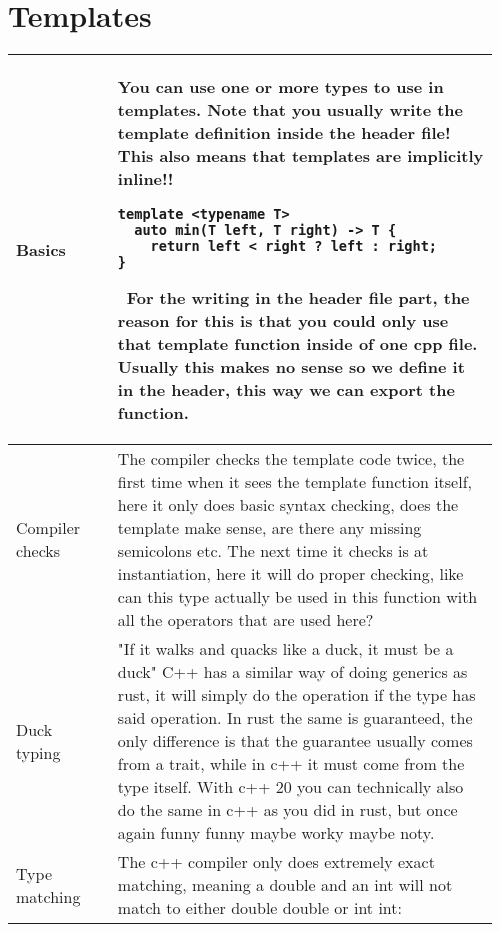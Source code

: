 \documentclass[main.tex,fontsize=8pt,paper=a4,paper=portrait,DIV=calc,]{scrartcl}
\begin{document}
\begin{table}[ht!]
\section{Templates}
\begin{tabular}{|m{0.2\linewidth}|m{0.755\linewidth}|}
\hline
Basics & 
You can use one or more types to use in templates.\newline
\textcolor{OliveGreen}{Note that you usually write the template definition inside the header file!\newline
\textbf{This also means that templates are implicitly inline!!}}\newline
\begin{lstlisting}
template <typename T>
  auto min(T left, T right) -> T {
    return left < right ? left : right;
}
\end{lstlisting}
\, \newline
For the writing in the header file part, the reason for this is that you could only use that template function inside of one cpp file. Usually this makes no sense so we define it in the header, this way we can export the function.\\
\hline
Compiler checks & 
The compiler checks the template code twice, the first time when it sees the template function itself, here it only does basic syntax checking, does the template make sense, are there any missing semicolons etc.\newline
The next time it checks is at instantiation, here it will do proper checking, like can this type actually be used in this function with all the operators that are used here?\\
\hline
Duck typing & 
"If it walks and quacks like a duck, it must be a duck"\newline
C++ has a similar way of doing generics as rust, it will simply do the operation if the type has said operation.\newline
In rust the same is guaranteed, the only difference is that the guarantee usually comes from a trait, while in c++ it must come from the type itself.\newline
With c++ 20 you can technically also do the same in c++ as you did in rust, but once again funny funny maybe worky maybe noty.\\
\hline
Type matching & 
The c++ compiler only does extremely exact matching, meaning a double and an int will not match to either double double or int int:\newline

\end{tabular}
\end{table}
\end{document}
